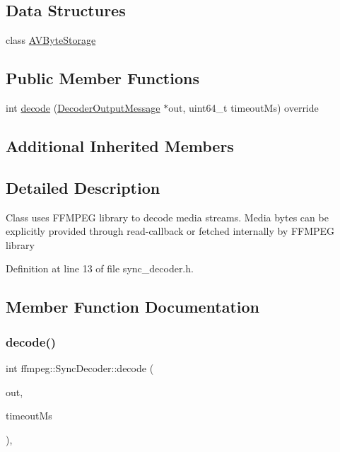 \subsection*{Data Structures}
\begin{DoxyCompactItemize}
\item 
class \hyperlink{classffmpeg_1_1SyncDecoder_1_1AVByteStorage}{A\+V\+Byte\+Storage}
\end{DoxyCompactItemize}
\subsection*{Public Member Functions}
\begin{DoxyCompactItemize}
\item 
int \hyperlink{classffmpeg_1_1SyncDecoder_a61f546538c125ba3951a0f572eca49d1}{decode} (\hyperlink{structffmpeg_1_1DecoderOutputMessage}{Decoder\+Output\+Message} $\ast$out, uint64\+\_\+t timeout\+Ms) override
\end{DoxyCompactItemize}
\subsection*{Additional Inherited Members}


\subsection{Detailed Description}
Class uses F\+F\+M\+P\+EG library to decode media streams. Media bytes can be explicitly provided through read-\/callback or fetched internally by F\+F\+M\+P\+EG library 

Definition at line 13 of file sync\+\_\+decoder.\+h.



\subsection{Member Function Documentation}
\mbox{\label{classffmpeg_1_1SyncDecoder_a61f546538c125ba3951a0f572eca49d1}} 
\subsubsection{\texorpdfstring{decode()}{decode()}}
{\footnotesize\ttfamily int ffmpeg\+::\+Sync\+Decoder\+::decode (\begin{DoxyParamCaption}\item[{\hyperlink{structffmpeg_1_1DecoderOutputMessage}{Decoder\+Output\+Message} $\ast$}]{out,  }\item[{uint64\+\_\+t}]{timeout\+Ms }\end{DoxyParamCaption})\hspace{0.3cm}{\ttfamily [override]}, {\ttfamily [virtual]}}

